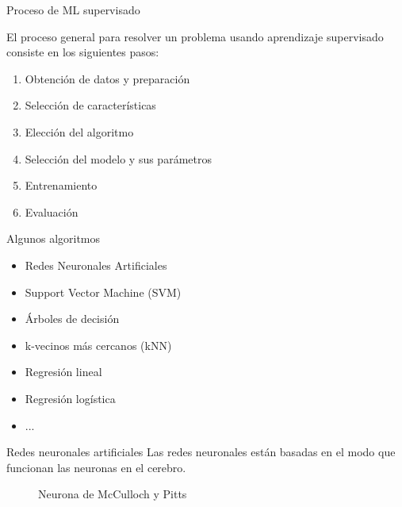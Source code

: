 \documentclass[hyperref={unicode}]{beamer}
\begin{document}
\begin{frame}{Proceso de ML supervisado}

El proceso general para resolver un problema usando aprendizaje supervisado consiste en los siguientes pasos:\\

	\begin{enumerate}
		\item \pause Obtención de datos y preparación
		
		\item \pause Selección de características
		
		\item \pause Elección del algoritmo 
		
		\item \pause Selección del modelo y sus parámetros
		
		\item \pause Entrenamiento
		
		\item \pause Evaluación
	\end{enumerate}
\end{frame}

\begin{frame}{Algunos algoritmos}
	\begin{itemize}
		\item Redes Neuronales Artificiales
			\item Support Vector Machine (SVM)
			\item Árboles de decisión
			\item k-vecinos más cercanos (kNN)
			\item Regresión lineal
			\item Regresión logística
			\item ...
	\end{itemize}
\end{frame}



\begin{frame}{Redes neuronales artificiales}
	Las redes neuronales están basadas en el modo que funcionan las neuronas en el cerebro.\\
	
	
	\begin{figure}[htbp!]
	\centering
	\resizebox{!}{0.5\width}{\neuronaMcCullochPitts}
		
	\caption{Neurona de McCulloch y Pitts}
	\end{figure}
\end{frame}
\end{document}
